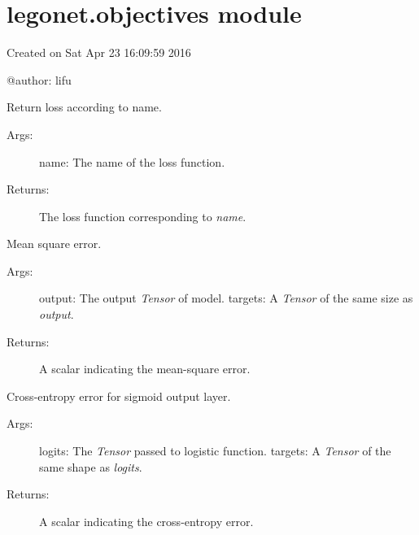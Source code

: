 \documentclass[letterpaper,10pt,english]{sphinxmanual}
\begin{document}
\section{legonet.objectives module}
\label{legonet:module-legonet.objectives}\label{legonet:legonet-objectives-module}
Created on Sat Apr 23 16:09:59 2016

@author: lifu

\begin{fulllineitems}
\label{legonet:legonet.objectives.get}
Return loss according to name.
\begin{description}
\item[{Args:}] \leavevmode
name: The name of the loss function.

\item[{Returns:}] \leavevmode
The loss function corresponding to \emph{name}.

\end{description}

\end{fulllineitems}


\begin{fulllineitems}
\label{legonet:legonet.objectives.mean_square}
Mean square error.
\begin{description}
\item[{Args:}] \leavevmode
output: The output \emph{Tensor} of model.
targets: A \emph{Tensor} of the same size as \emph{output}.

\item[{Returns:}] \leavevmode
A scalar indicating the mean-square error.

\end{description}

\end{fulllineitems}


\begin{fulllineitems}
\label{legonet:legonet.objectives.sigmoid_cross_entropy}
Cross-entropy error for sigmoid output layer.
\begin{description}
\item[{Args:}] \leavevmode
logits: The \emph{Tensor} passed to logistic function.
targets: A \emph{Tensor} of the same shape as \emph{logits}.

\item[{Returns:}] \leavevmode
A scalar indicating the cross-entropy error.

\end{description}

\end{fulllineitems}
\end{document}
